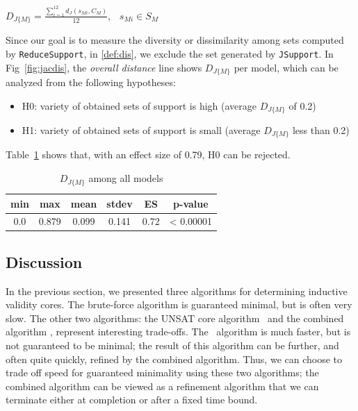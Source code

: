 \begin{definition}
  \label{def:dis}
  $D_{J\{M\}} =  \frac{\sum_{i=1}^{12}d_J(s_{Mi}, C_M)}{12},   \hspace{9pt} s_{Mi} \in S_M$
\end{definition}

Since our goal is to measure the diversity or dissimilarity among sets computed by \texttt{ReduceSupport}, in \ref{def:dis}, we exclude the set generated by \texttt{JSupport}. In Fig~\ref{fig:jacdis}, the \emph{overall distance} line shows $D_{J\{M\}}$ per model, which can be analyzed from the following hypotheses:
\begin{itemize}
  \item H0: variety of obtained sets of support is high (average $D_{J\{M\}}$ of 0.2)
  \item H1: variety of obtained sets of support is small (average $D_{J\{M\}}$ less than 0.2)
\end{itemize}
Table~\ref{tab:variety} shows that, with an effect size of 0.79, H0 can be rejected.
\begin{table}
  \centering
  \begin{tabular}{ |c|c|c|c|c|c| }
    \hline
     min & max & mean & stdev & ES & p-value\\[0.5ex]
    \hline
     0.0   & 0.879 & 0.099 & 0.141 & 0.72 & < 0.00001 \\[0.5ex]
    \hline
  \end{tabular}
  \caption{$D_{J\{M\}}$ among all models}
  \label{tab:variety}
\end{table}
\fi


\subsection{Discussion}

In the previous section, we presented three algorithms for determining inductive validity cores.  The brute-force algorithm is guaranteed minimal, but is often very slow.  The other two algorithms: the UNSAT core algorithm \ucalg\ and the combined algorithm \ucbfalg, represent interesting trade-offs.  The \ucalg\ algorithm is much faster, but is not guaranteed to be minimal; the result of this algorithm can be further, and often quite quickly, refined by the combined algorithm.  Thus, we can choose to trade off speed for guaranteed minimality using these two algorithms; the combined algorithm can be viewed as a refinement algorithm that we can terminate either at completion or after a fixed time bound.


